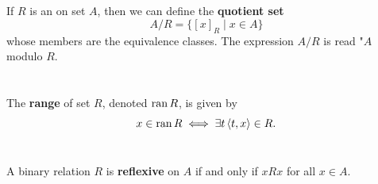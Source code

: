 \documentclass{report}
\newcommand{\pair}[1]{\left< #1 \right>}
\begin{document}
\begin{axiom}


\end{axiom}

\section{}%

If $R$ is an  on set $A$, then we can define
  the \textbf{quotient set} $$A / R = \{[x]_R \mid x \in A\}$$ whose members are
  the equivalence classes.
The expression $A / R$ is read "$A$ modulo $R$.

\begin{definition}


\end{definition}

\section{}%

The \textbf{range} of set $R$, denoted $\mathop{\text{ran}}{R}$, is given by
  $$x \in \ran{R} \iff \exists t \pair{t, x} \in R.$$

\begin{definition}

  \statementpadding



\end{definition}

\section{}%

A binary relation $R$ is \textbf{reflexive} on $A$ if and only if $xRx$ for all
  $x \in A$.

\begin{definition}

  \statementpadding



\end{definition}
\end{document}
